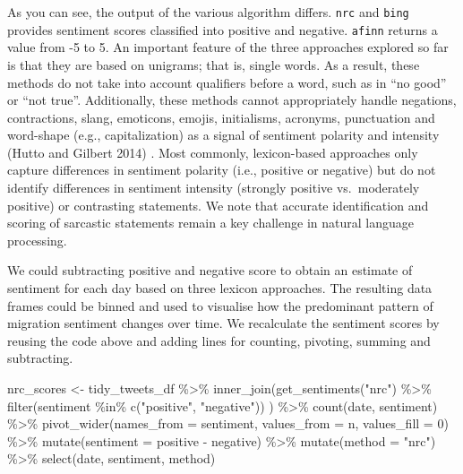 \documentclass[
  letterpaper,
  DIV=11,
  numbers=noendperiod]{scrreprt}
\newenvironment{Shaded}{\begin{snugshade}}{\end{snugshade}}
\newcommand{\AttributeTok}[1]{\textcolor[rgb]{0.40,0.45,0.13}{#1}}
\newcommand{\DecValTok}[1]{\textcolor[rgb]{0.68,0.00,0.00}{#1}}
\newcommand{\FunctionTok}[1]{\textcolor[rgb]{0.28,0.35,0.67}{#1}}
\newcommand{\NormalTok}[1]{\textcolor[rgb]{0.00,0.23,0.31}{#1}}
\newcommand{\OtherTok}[1]{\textcolor[rgb]{0.00,0.23,0.31}{#1}}
\newcommand{\SpecialCharTok}[1]{\textcolor[rgb]{0.37,0.37,0.37}{#1}}
\newcommand{\StringTok}[1]{\textcolor[rgb]{0.13,0.47,0.30}{#1}}
\begin{document}
As you can see, the output of the various algorithm differs.
\texttt{nrc} and \texttt{bing} provides sentiment scores classified into
positive and negative. \texttt{afinn} returns a value from -5 to 5. An
important feature of the three approaches explored so far is that they
are based on unigrams; that is, single words. As a result, these methods
do not take into account qualifiers before a word, such as in ``no
good'' or ``not true''. Additionally, these methods cannot appropriately
handle negations, contractions, slang, emoticons, emojis, initialisms,
acronyms, punctuation and word-shape (e.g., capitalization) as a signal
of sentiment polarity and intensity (Hutto and Gilbert 2014) . Most
commonly, lexicon-based approaches only capture differences in sentiment
polarity (i.e., positive or negative) but do not identify differences in
sentiment intensity (strongly positive vs.~moderately positive) or
contrasting statements. We note that accurate identification and scoring
of sarcastic statements remain a key challenge in natural language
processing.

We could subtracting positive and negative score to obtain an estimate
of sentiment for each day based on three lexicon approaches. The
resulting data frames could be binned and used to visualise how the
predominant pattern of migration sentiment changes over time. We
recalculate the sentiment scores by reusing the code above and adding
lines for counting, pivoting, summing and subtracting.

\begin{Shaded}
\begin{Highlighting}[]
\NormalTok{nrc\_scores }\OtherTok{\textless{}{-}}\NormalTok{ tidy\_tweets\_df }\SpecialCharTok{\%\textgreater{}\%}
  \FunctionTok{inner\_join}\NormalTok{(}\FunctionTok{get\_sentiments}\NormalTok{(}\StringTok{"nrc"}\NormalTok{) }\SpecialCharTok{\%\textgreater{}\%} 
                 \FunctionTok{filter}\NormalTok{(sentiment }\SpecialCharTok{\%in\%} \FunctionTok{c}\NormalTok{(}\StringTok{"positive"}\NormalTok{, }
                                         \StringTok{"negative"}\NormalTok{))}
\NormalTok{             ) }\SpecialCharTok{\%\textgreater{}\%}
  \FunctionTok{count}\NormalTok{(date, sentiment) }\SpecialCharTok{\%\textgreater{}\%} 
  \FunctionTok{pivot\_wider}\NormalTok{(}\AttributeTok{names\_from =}\NormalTok{ sentiment,}
              \AttributeTok{values\_from =}\NormalTok{ n,}
              \AttributeTok{values\_fill =} \DecValTok{0}\NormalTok{) }\SpecialCharTok{\%\textgreater{}\%} 
  \FunctionTok{mutate}\NormalTok{(}\AttributeTok{sentiment =}\NormalTok{ positive }\SpecialCharTok{{-}}\NormalTok{ negative) }\SpecialCharTok{\%\textgreater{}\%} 
  \FunctionTok{mutate}\NormalTok{(}\AttributeTok{method =} \StringTok{"nrc"}\NormalTok{) }\SpecialCharTok{\%\textgreater{}\%} 
  \FunctionTok{select}\NormalTok{(date, sentiment, method)}
\end{Highlighting}
\end{Shaded}
\end{document}
